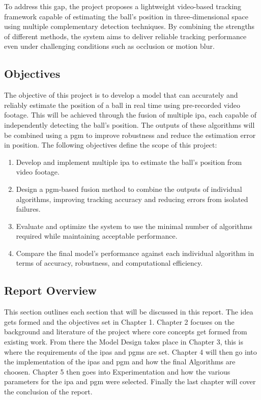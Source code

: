 \documentclass[12pt,a4paper]{article}
\begin{document}
To address this gap, the project proposes a lightweight video-based tracking framework capable of estimating the ball’s position in three-dimensional space using multiple complementary detection techniques. By combining the strengths of different methods, the system aims to deliver reliable tracking performance even under challenging conditions such as occlusion or motion blur.

\subsection{Objectives}
The objective of this project is to develop a model that can accurately and reliably estimate the position of a ball in real time using pre-recorded video footage. This will be achieved through the fusion of multiple \acs{ipa}, each capable of independently detecting the ball's position. The outputs of these algorithms will be combined using a \acs{pgm} to improve robustness and reduce the estimation error in position. The following objectives define the scope of this project:

\begin{enumerate}
	\item Develop and implement multiple \acs{ipa} to estimate the ball’s position from video footage.
	\item Design a \acs{pgm}-based fusion method to combine the outputs of individual algorithms, improving tracking accuracy and reducing errors from isolated failures.
	\item Evaluate and optimize the system to use the minimal number of algorithms required while maintaining acceptable performance.
	\item Compare the final model’s performance against each individual algorithm in terms of accuracy, robustness, and computational efficiency.
\end{enumerate}

\subsection{Report Overview}
This section outlines each section that will be discussed in this report. The idea gets formed and the objectives set in Chapter 1. Chapter 2 focuses on the background and literature of the project where core concepts get formed from existing work. From there the Model Design takes place in Chapter 3, this is where the requirements of the \acs{ipa}s and \acs{pgm}s are set. Chapter 4 will then go into the implementation of the \acs{ipa}s and \acs{pgm} and how the final Algorithms are choosen. Chapter 5 then goes into Experimentation and how the various parameters for the \acs{ipa} and \acs{pgm} were selected. Finally the last chapter will cover the conclusion of the report.
\end{document}
